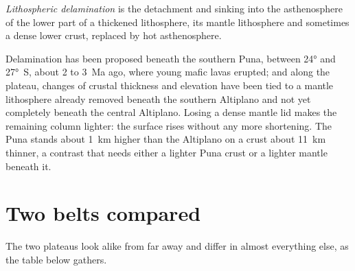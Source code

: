\begin{definition}\label{def:b2:himalaya-andes:delamination}
\emph{Lithospheric delamination} is the detachment and
sinking into the asthenosphere of the lower part of a thickened lithosphere, its mantle
lithosphere and sometimes a dense lower crust, replaced by hot asthenosphere.
\end{definition}

Delamination has been proposed beneath the southern Puna, between \ang{24} and \ang{27}~S,
about 2 to \qty{3}{Ma} ago, where young mafic lavas erupted; and along the plateau, changes
of crustal thickness and elevation have been tied to a mantle lithosphere already removed
beneath the southern Altiplano and not yet completely beneath the central Altiplano. Losing a
dense mantle lid makes the remaining column lighter: the surface rises without any more
shortening. The Puna stands about \qty{1}{km} higher than the Altiplano on a crust about
\qty{11}{km} thinner, a contrast that needs either a lighter Puna crust or a lighter mantle
beneath it.

\section{Two belts compared}\label{sec:b2:himalaya-andes:compared}

The two plateaus look alike from far away and differ in almost everything else, as the table
below gathers.

